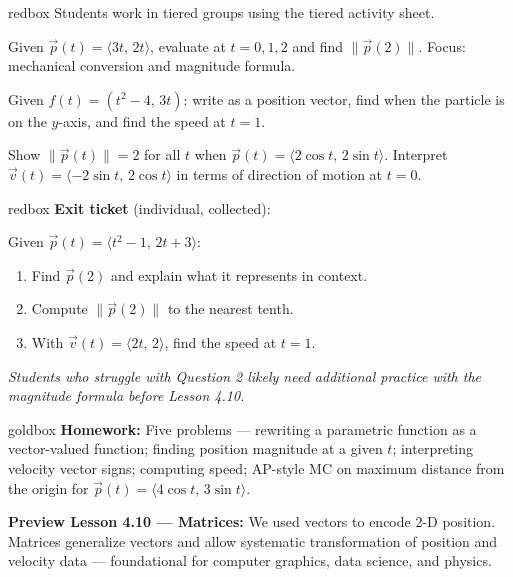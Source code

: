 \documentclass[10pt]{article}
\begin{document}
\begin{skillbox}{redbox}
Students work in tiered groups using the tiered activity sheet.

\medskip
\begin{tcolorbox}[colback=white, colframe=black!40,
    title=\textbf{Tier R --- Remediate},
    fonttitle=\bfseries, arc=2mm, left=3mm, right=3mm, top=1mm, bottom=1mm]
Given $\vec{p}(t)=\langle 3t,\,2t\rangle$, evaluate at $t=0,1,2$ and find
$\|\vec{p}(2)\|$.  Focus: mechanical conversion and magnitude formula.
\end{tcolorbox}

\smallskip
\begin{tcolorbox}[colback=white, colframe=black!40,
    title=\textbf{Tier A --- Apply},
    fonttitle=\bfseries, arc=2mm, left=3mm, right=3mm, top=1mm, bottom=1mm]
Given $f(t)=(t^{2}-4,\,3t)$: write as a position vector, find when the
particle is on the $y$-axis, and find the speed at $t=1$.
\end{tcolorbox}

\smallskip
\begin{tcolorbox}[colback=white, colframe=black!40,
    title=\textbf{Tier E --- Extend},
    fonttitle=\bfseries, arc=2mm, left=3mm, right=3mm, top=1mm, bottom=1mm]
Show $\|\vec{p}(t)\|=2$ for all $t$ when $\vec{p}(t)=\langle 2\cos t,\,2\sin t\rangle$.
Interpret $\vec{v}(t)=\langle -2\sin t,\,2\cos t\rangle$ in terms of direction of
motion at $t=0$.
\end{tcolorbox}
\end{skillbox}

\begin{skillbox}{redbox}
\textbf{Exit ticket} (individual, collected):

Given $\vec{p}(t)=\langle t^{2}-1,\,2t+3\rangle$:
\begin{enumerate}
  \item Find $\vec{p}(2)$ and explain what it represents in context.
  \item Compute $\|\vec{p}(2)\|$ to the nearest tenth.
  \item With $\vec{v}(t)=\langle 2t,\,2\rangle$, find the speed at $t=1$.
\end{enumerate}
\textit{Students who struggle with Question 2 likely need additional practice with
the magnitude formula before Lesson 4.10.}
\end{skillbox}

\begin{skillbox}{goldbox}
\textbf{Homework:} Five problems — rewriting a parametric function as a
vector-valued function; finding position magnitude at a given $t$;
interpreting velocity vector signs; computing speed; AP-style MC on maximum
distance from the origin for $\vec{p}(t)=\langle 4\cos t,\,3\sin t\rangle$.

\medskip
\textbf{Preview Lesson 4.10 --- Matrices:} We used vectors to encode 2-D
position. Matrices generalize vectors and allow systematic transformation of
position and velocity data --- foundational for computer graphics, data
science, and physics.
\end{skillbox}
\end{document}
